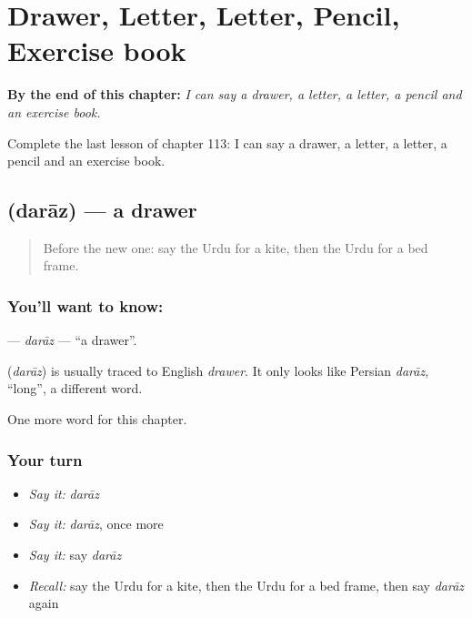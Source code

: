 
\chapter{Drawer, Letter, Letter, Pencil, Exercise book}
\label{ch:ur-drawer-letter-letter-pencil-exercise-book}

\begin{chapteropening}
\textbf{By the end of this chapter:} \emph{I can say a drawer, a letter, a letter, a pencil and an exercise book.}

Complete the last lesson of chapter 113: I can say a drawer, a letter, a letter, a pencil and an exercise book.
\end{chapteropening}

\section[\texorpdfstring{\ur{دراز} (darāz)}{دراز (darāz)}]{ (darāz) — a drawer}

\label{lesson:UR-C113-daraz}



\begin{quote}
Before the new one: say the Urdu for a kite, then the Urdu for a bed frame.
\end{quote}

\subsection*{You'll want to know: }
\textbf{} — \emph{darāz} — \textquotedblleft{}a drawer\textquotedblright{}.

\begin{cousinweb}
\textbf{} (\emph{darāz}) is usually traced to English \emph{drawer}. It only looks like Persian \emph{darāz}, \textquotedblleft{}long\textquotedblright{}, a different word.
\end{cousinweb}

\begin{grammarlens}[title={What you've built}]
One more word for this chapter.
\end{grammarlens}

\subsection*{Your turn}
\begin{itemize}
\raggedright
  \item \emph{Say it:} \emph{darāz}
  \item \emph{Say it:} \emph{darāz}, once more
  \item \emph{Say it:} say \emph{darāz}
  \item \emph{Recall:} say the Urdu for a kite, then the Urdu for a bed frame, then say \emph{darāz} again
\end{itemize}


